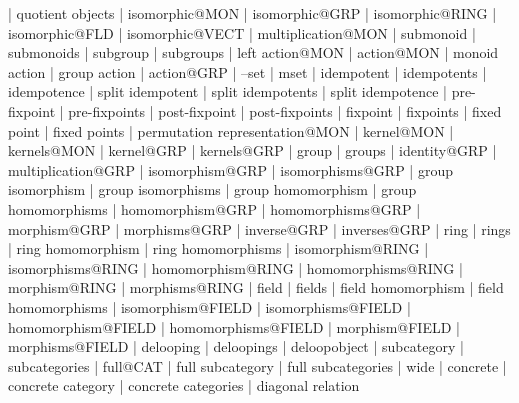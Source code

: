     |   quotient objects
    |   isomorphic@MON
    |   isomorphic@GRP
    |   isomorphic@RING
    |   isomorphic@FLD
    |   isomorphic@VECT
    |   multiplication@MON
    |   submonoid
    |   submonoids
    |   subgroup
    |   subgroups
    |   left action@MON
    |   action@MON
    |   monoid action
    |   group action
    |   action@GRP
    |   --set
    |   mset
    |   idempotent
    |   idempotents
    |   idempotence 
    |   split idempotent
    |   split idempotents
    |   split idempotence 
    |   pre-fixpoint
    |   pre-fixpoints
    |   post-fixpoint
    |   post-fixpoints
    |   fixpoint
    |   fixpoints
    |   fixed point
    |   fixed points
    |   permutation representation@MON
    |   kernel@MON
    |   kernels@MON
    |   kernel@GRP
    |   kernels@GRP
    |   group
    |   groups
    |   identity@GRP
    |   multiplication@GRP
    |   isomorphism@GRP
    |   isomorphisms@GRP
    |   group isomorphism
    |   group isomorphisms
    |   group homomorphism
    |   group homomorphisms
    |   homomorphism@GRP
    |   homomorphisms@GRP
    |   morphism@GRP
    |   morphisms@GRP
    |   inverse@GRP
    |   inverses@GRP
    |   ring
    |   rings
    |   ring homomorphism
    |   ring homomorphisms
    |   isomorphism@RING
    |   isomorphisms@RING
    |   homomorphism@RING
    |   homomorphisms@RING
    |   morphism@RING
    |   morphisms@RING
    |   field
    |   fields
    |   field homomorphism
    |   field homomorphisms
    |   isomorphism@FIELD
    |   isomorphisms@FIELD
    |   homomorphism@FIELD
    |   homomorphisms@FIELD
    |   morphism@FIELD
    |   morphisms@FIELD
    |   delooping
    |   deloopings
    |   deloopobject
    |   subcategory
    |   subcategories
    |   full@CAT
    |   full subcategory
    |   full subcategories
    |   wide
    |   concrete
    |   concrete category
    |   concrete categories
    |   diagonal relation
